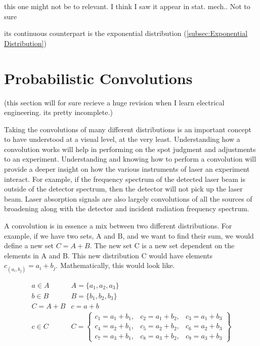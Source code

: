\documentclass[11pt,a4paper]{book}
\begin{document}
			this one might not be to relevant. I think I saw it appear in stat. mech.. Not to sure
			
			its continuous counterpart is the exponential distribution (\autoref{subsec:Exponential Distribution})			
	\section{Probabilistic Convolutions}
		\label{subsec:convolution}
		(this section will for sure recieve a huge revision when I learn electrical engineering. its pretty incomplete.)
		
		Taking the  convolutions of many different distributions is an important concept to have understood at a visual level, at the very least. Understanding how a convolution works will help in performing on the spot judgment and adjustments to an experiment. Understanding and knowing how to perform a convolution will provide a deeper insight on how the various instruments of laser an experiment interact. For example, if the frequency spectrum of the detected laser beam is outside of the detector spectrum, then the detector will not pick up the laser beam. Laser absorption signals are also largely convolutions of all the sources of broadening along with the detector and incident radiation frequency spectrum.
		
		A convolution is in essence a mix between two different distributions. For example, if we have two sets, A and B, and we want to find their sum, we would define a new set $C = A + B$. The new set C is a new set dependent on the elements in A and B. This new distribution C would have elements $c_{(a_i,b_j)} = a_i + b_j$. Mathematically, this would look like.
		
		\begin{equation}
			\label{eq: C = A + B convolution}
			\begin{matrix}
			a \in A & A =\{a_1, a_2, a_3\} \\
			b \in B & B =\{b_1, b_2, b_3\} \\
			C = A + B & c = a + b \\
			c  \in C & C= 
				\begin{Bmatrix}
					c_1 = a_1 + b _1,& c_2 = a_1 + b_2, & c_3 = a_1 + b_3 \\
					c_4 = a_2 + b_1, & c_5 = a_2 + b_2, & c_6 = a_2 + b_3 \\
					c_7 = a_3 + b_1, & c_8 = a_3 + b_2, & c_9 = a_3 +b_ 3
				\end{Bmatrix}
			\end{matrix}
		\end{equation}
		
\end{document}
